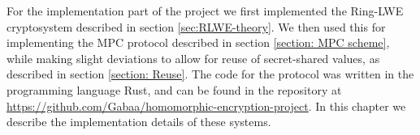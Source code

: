 \documentclass[../main.tex]{subfiles}
\begin{document}
\noindent For the implementation part of the project we first implemented the Ring-LWE cryptosystem described in section \ref{sec:RLWE-theory}. We then used this for implementing the MPC protocol described in section \ref{section: MPC scheme}, while making slight deviations to allow for reuse of secret-shared values, as described in section \ref{section: Reuse}.
The code for the protocol was written in the programming language Rust, and can be found in the repository at \url{https://github.com/Gabaa/homomorphic-encryption-project}.
In this chapter we describe the implementation details of these systems.
\end{document}
